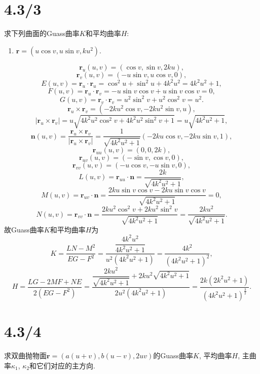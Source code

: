 \documentclass[11pt,a4paper]{article}
\author{刘逸灏 (515370910207)}
\begin{document}
\maketitle

\section{4.3/3}
\begin{problem}
求下列曲面的Guass曲率$K$和平均曲率$H$:
\begin{enumerate}
  \item $\mathbf{r}=(u\cos v,u\sin v,ku^2)$.
\end{enumerate}
\end{problem}

$$\mathbf{r}_u(u,v)=(\cos v,\sin v,2ku),$$
$$\mathbf{r}_v(u,v)=(-u\sin v,u\cos v,0),$$
$$E(u,v)=\mathbf{r}_u\cdot \mathbf{r}_u=\cos^2u+\sin^2u+4k^2u^2=4k^2u^2+1,$$
$$F(u,v)=\mathbf{r}_u\cdot \mathbf{r}_v=-u\sin v\cos v+u\sin v\cos v=0,$$
$$G(u,v)=\mathbf{r}_v\cdot \mathbf{r}_v=u^2\sin^2v+u^2\cos^2v=u^2.$$
$$\mathbf{r}_u\times\mathbf{r}_v=(-2ku^2\cos v,-2ku^2\sin v,u),$$
$$|\mathbf{r}_u\times\mathbf{r}_v|=u\sqrt{4k^2u^2\cos^2v+4k^2u^2\sin^2v+1}=u\sqrt{4k^2u^2+1},$$
$$\mathbf{n}(u,v)=\frac{\mathbf{r}_u\times\mathbf{r}_v}{|\mathbf{r}_u\times\mathbf{r}_v|}=\frac{1}{\sqrt{4k^2u^2+1}}(-2ku\cos v,-2ku\sin v,1),$$
$$\mathbf{r}_{uu}(u,v)=(0,0,2k),$$
$$\mathbf{r}_{uv}(u,v)=(-\sin v,\cos v,0),$$
$$\mathbf{r}_{vv}(u,v)=(-u\cos v,-u\sin v,0),$$
$$L(u,v)=\mathbf{r}_{uu}\cdot\mathbf{n}=\frac{2k}{\sqrt{4k^2u^2+1}},$$
$$M(u,v)=\mathbf{r}_{uv}\cdot\mathbf{n}=\frac{2ku\sin v\cos v-2ku\sin v\cos v}{\sqrt{4k^2u^2+1}}=0,$$
$$N(u,v)=\mathbf{r}_{vv}\cdot\mathbf{n}=\frac{2ku^2\cos^2 v+2ku^2\sin^2v}{\sqrt{4k^2u^2+1}}=\frac{2ku^2}{\sqrt{4k^2u^2+1}}.$$
故Guass曲率$K$和平均曲率$H$为
$$K=\frac{LN-M^2}{EG-F^2}=\frac{\dfrac{4k^2u^2}{4k^2u^2+1}}{u^2(4k^2u^2+1)}=\frac{4k^2}{(4k^2u^2+1)^2},$$
$$H=\frac{LG-2MF+NE}{2(EG-F^2)}=\frac{\dfrac{2ku^2}{\sqrt{4k^2u^2+1}}+2ku^2\sqrt{4k^2u^2+1}}{2u^2(4k^2u^2+1)}=\frac{2k(2k^2u^2+1)}{(4k^2u^2+1)^{\frac{3}{2}}}.$$

\section{4.3/4}
\begin{problem}
求双曲抛物面$\mathbf{r}=(a(u+v),b(u-v),2uv)$的Guass曲率$K$, 平均曲率$H$, 主曲率$\kappa_1$, $\kappa_2$和它们对应的主方向.
\end{problem}
\end{document}
